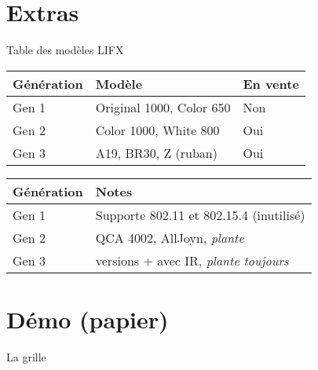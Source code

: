 \documentclass{lgtdslides}
\begin{document}
\section{Extras}

\begin{frame}{Table des modèles LIFX}
\begin{tabular}{lll}
\textbf{Génération} & \textbf{Modèle} & \textbf{En vente} \\
\hline
Gen 1 & Original 1000, Color 650 & Non \\
\hline
Gen 2 & Color 1000, White 800 & Oui \\
\hline
Gen 3 & A19, BR30, Z (ruban) & Oui \\
\end{tabular}
\par\vspace{2em}
\begin{tabular}{ll}
\textbf{Génération} & \textbf{Notes} \\
\hline
Gen 1 & Supporte 802.11 et 802.15.4 (inutilisé) \\
\hline
Gen 2 & QCA 4002, AllJoyn, \emph{plante} \\
\hline
Gen 3 & versions + avec IR, \emph{plante toujours} \\
\end{tabular}
\end{frame}

\section{Démo (papier)}

\begin{frame}{La grille}
\begin{center}
\end{center}
\end{frame}
\end{document}

